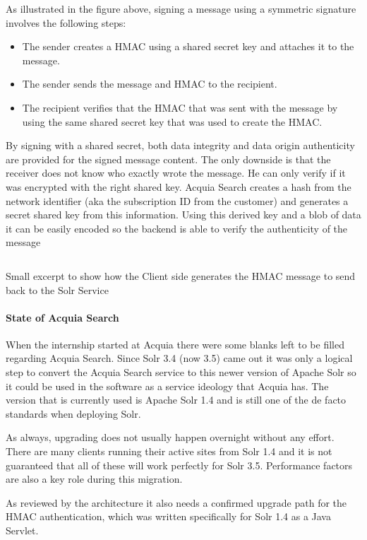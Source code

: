 As illustrated in the figure above, signing a message using a symmetric signature involves the following steps:

\begin{itemize}
\item The sender creates a HMAC using a shared secret key and attaches it to the message.
\item The sender sends the message and HMAC to the recipient.
\item The recipient verifies that the HMAC that was sent with the message by using the same shared secret key that was used to create the HMAC.
\end{itemize}

By signing with a shared secret, both data integrity and data origin authenticity are provided for the signed message content. The only downside is that the receiver does not know who exactly wrote the message. He can only verify if it was encrypted with the right shared key. Acquia Search creates a hash from the network identifier (aka the subscription ID from the customer) and generates a secret shared key from this information. Using this derived key and a blob of data it can be easily encoded so the backend is able to verify the authenticity of the message

\inputminted[fontsize=\scriptsize,linenos]{php}{./code_examples/hmac_snippet.php}
\caption{Small excerpt to show how the Client side generates the HMAC message to send back to the Solr Service}

\paragraph{State of Acquia Search}
When the internship started at Acquia there were some blanks left to be filled regarding Acquia Search. Since Solr 3.4 (now 3.5) came out it was only a logical step to convert the Acquia Search service to this newer version of Apache Solr so it could be used in the software as a service ideology that Acquia has. The version that is currently used is Apache Solr 1.4 and is still one of the de facto standards when deploying Solr.

As always,  upgrading does not usually happen overnight without any effort. There are many clients running their active sites from Solr 1.4 and it is not guaranteed that all of these will work perfectly for Solr 3.5. Performance factors are also a key role during this migration. 

As reviewed by the architecture it also needs a confirmed upgrade path for the HMAC authentication, which was written specifically for Solr 1.4 as a Java Servlet.

